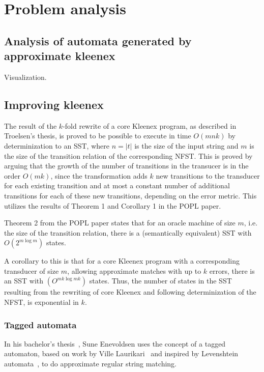 \section{Problem analysis}

\subsection{Analysis of automata generated by approximate kleenex}

Visualization.

\subsection{Improving kleenex}


The result of the $k$-fold rewrite of a core Kleenex program, as described in
Troelsen's thesis, is proved to be possible to execute in time $O(mnk)$ by
determinization to an SST, where $n = |t|$ is the size of the input string and
$m$ is the size of the transition relation of the corresponding NFST. This is
proved by arguing that the growth of the number of transitions in the transucer
is in the order $O(mk)$, since the transformation adds $k$ new transitions to
the transducer for each existing transition and at most a constant number of
additional transitions for each of these new transitions, depending on the
error metric.  This utilizes the results of Theorem 1 and Corollary 1 in the
POPL paper.

Theorem 2 from the POPL paper states that for an oracle machine of size $m$,
i.e. the size of the transition relation, there is a (semantically equivalent)
SST with $O(2^{m \log m})$ states.

A corollary to this is that for a core Kleenex program with a corresponding
transducer of size $m$, allowing approximate matches with up to $k$ errors,
there is an SST with $(O^{mk \log mk})$ states. Thus, the number of states in
the SST resulting from the rewriting of core Kleenex and following
determinization of the NFST, is exponential in $k$.



\subsubsection{Tagged automata}

In his bachelor's thesis~\cite{enevoldsen2015pattern}, Sune Enevoldsen uses the
concept of a tagged automaton, based on work by Ville
Laurikari~\cite{laurikari2000nfas, laurikari2001efficient} and inspired by
Levenshtein automata~\cite{schulz2002fast}, to do approximate regular string
matching.


